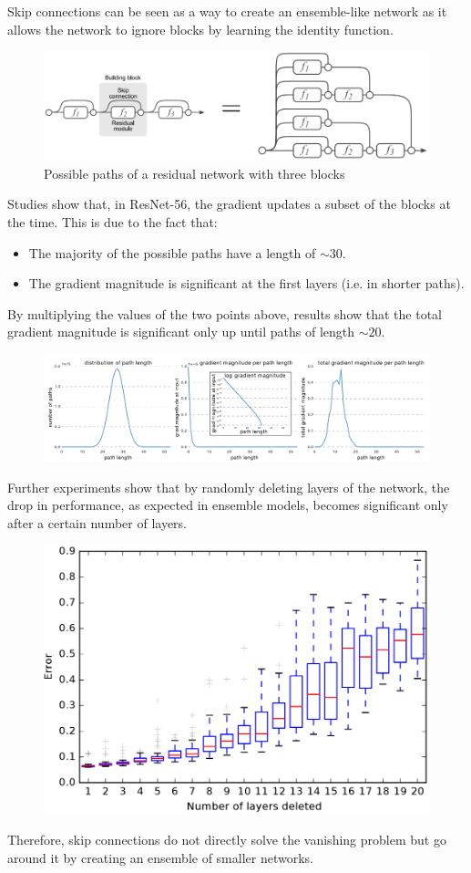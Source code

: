 \begin{remark}
    Skip connections can be seen as a way to create an ensemble-like network as it allows the network to ignore blocks by learning the identity function.
    \begin{figure}[H]
        \centering
        \includegraphics[width=0.6\linewidth]{./img/resnet_ensemble.png}
        \caption{Possible paths of a residual network with three blocks}
    \end{figure}

    Studies show that, in ResNet-56, the gradient updates a subset of the blocks at the time. This is due to the fact that:
    \begin{itemize}
        \item The majority of the possible paths have a length of $\sim 30$.
        \item The gradient magnitude is significant at the first layers (i.e. in shorter paths).
    \end{itemize}
    By multiplying the values of the two points above, results show that the total gradient magnitude is significant only up until paths of length $\sim 20$.
    
    \begin{figure}[H]
        \centering
        \includegraphics[width=0.95\linewidth]{./img/resnet_ensemble_magnitude.png}
    \end{figure}

    Further experiments show that by randomly deleting layers of the network, the drop in performance, as expected in ensemble models, becomes significant only after a certain number of layers.
    \begin{figure}[H]
        \centering
        \includegraphics[width=0.4\linewidth]{./img/resnet_ensemble_experiment.png}
    \end{figure}

    Therefore, skip connections do not directly solve the vanishing problem but go around it by creating an ensemble of smaller networks. 
\end{remark}


